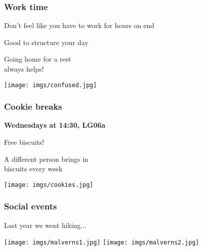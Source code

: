 \begin{frame}
    \frametitle{Work time}
    \centering
    \begin{minipage}{0.4\textwidth}
        \centering
        \Large

        Don't feel like you have to work
        for hours on end

        \vspace{1em}

        Good to \alert{structure} your day

        \vspace{1em}

        Going home for a rest \\
        always helps!

    \end{minipage}
    \qquad
    \begin{minipage}{0.4\textwidth}
        \texttt{[image: imgs/confused.jpg]}
    \end{minipage}
\end{frame}
\begin{frame}
    \frametitle{Cookie breaks}
    \centering

    \textbf{\LARGE Wednesdays at 14:30, LG06a}

    \vspace{1em}

    \begin{minipage}{0.4\textwidth}
        \centering
        \Large

        \alert{Free biscuits!}

        \vspace{1em}

        A different person brings in \\
        biscuits every week
    \end{minipage}
    \qquad
    \begin{minipage}{0.4\textwidth}
        \texttt{[image: imgs/cookies.jpg]}
    \end{minipage}
\end{frame}
\begin{frame}
    \frametitle{Social events}
    \centering

    \Large
    Last year we went hiking...

    \vspace{1em}

    \texttt{[image: imgs/malverns1.jpg]}
    \texttt{[image: imgs/malverns2.jpg]}


\end{frame}
